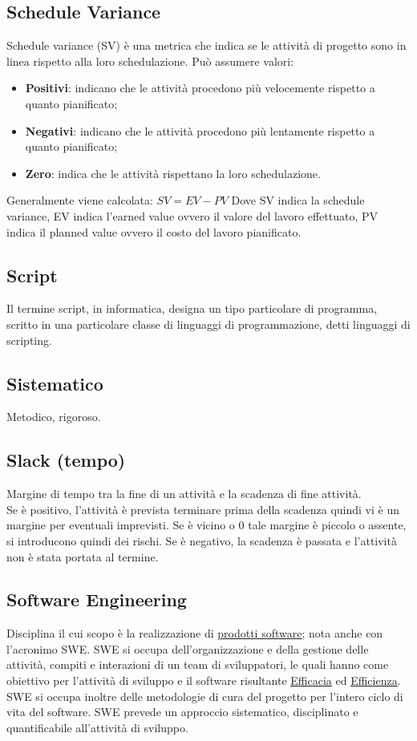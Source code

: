	
	\subsection{Schedule Variance}
	\label{sec:schedulevariance}
	Schedule variance (SV) è una metrica che indica se le attività di progetto sono in linea rispetto alla loro schedulazione.
	Può assumere valori:
	\begin{itemize}
	\item \textbf{Positivi}: indicano che le attività procedono più velocemente rispetto a quanto pianificato;
	\item \textbf{Negativi}: indicano che le attività procedono più lentamente rispetto a quanto pianificato;
	\item \textbf{Zero}: indica che le attività rispettano la loro schedulazione.
	\end{itemize}
	Generalmente viene calcolata: $SV = EV - PV$
	Dove SV indica la schedule variance, EV indica l'earned value ovvero il valore del lavoro effettuato, PV indica il planned value ovvero il costo del lavoro pianificato.


	\subsection{Script}
	\label{sec:script}
	Il termine script, in informatica, designa un tipo particolare di programma, scritto in una particolare classe di linguaggi di programmazione, detti linguaggi di scripting.


	\subsection{Sistematico}
	\label{sec:sistematico}
	Metodico, rigoroso.


	\subsection{Slack (tempo)}
	\label{sec:slackt}
	Margine di tempo tra la fine di un attività e la scadenza di fine attività. \\
	Se è positivo, l'attività è prevista terminare prima della scadenza quindi vi è un margine per eventuali imprevisti. Se è vicino o 0 tale margine è piccolo o assente, si introducono quindi dei rischi. Se è negativo, la scadenza è passata e l'attività non è stata portata al termine.


	\subsection{Software Engineering}
	\label{sec:swe}
	Disciplina il cui scopo è la realizzazione di  \underline{\hyperref[sec:prodottosoftware]{prodotti software}}; nota anche con l'acronimo SWE.
	SWE si occupa dell'organizzazione e della gestione delle attività, compiti e interazioni di un team di sviluppatori,
	le quali hanno come obiettivo per l'attività di sviluppo e il software risultante \underline{\hyperref[sec:efficacia]{Efficacia}} ed \underline{\hyperref[sec:efficienza]{Efficienza}}.
	SWE si occupa inoltre delle metodologie di cura del progetto per l'intero ciclo di vita del software.
	SWE prevede un approccio sistematico, disciplinato e quantificabile all'attività di sviluppo.


